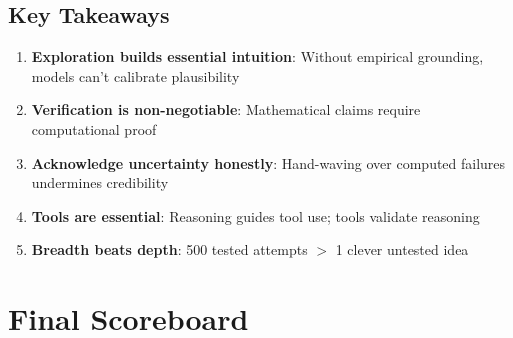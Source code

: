 \documentclass[11pt]{article}
\begin{document}
\begin{center}
\end{center}

\subsection{Key Takeaways}

\begin{enumerate}
\item \textbf{Exploration builds essential intuition}: Without empirical grounding, models can't calibrate plausibility
\item \textbf{Verification is non-negotiable}: Mathematical claims require computational proof
\item \textbf{Acknowledge uncertainty honestly}: Hand-waving over computed failures undermines credibility
\item \textbf{Tools are essential}: Reasoning guides tool use; tools validate reasoning
\item \textbf{Breadth beats depth}: 500 tested attempts $>$ 1 clever untested idea
\end{enumerate}

\section{Final Scoreboard}
\end{document}
